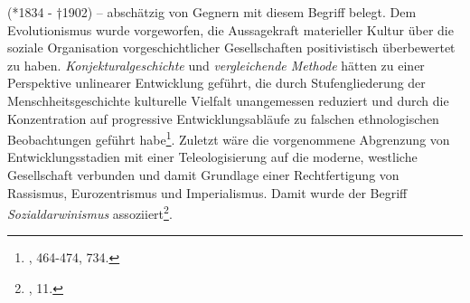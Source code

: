 \documentclass[openany,twoside,twocolumn]{book}
\let\rmarkdownfootnote\footnote%
\def\footnote{\protect\rmarkdownfootnote}
\begin{document}
(*1834 - †1902) -- abschätzig von Gegnern mit diesem Begriff belegt. Dem
Evolutionismus wurde vorgeworfen, die Aussagekraft materieller Kultur
über die soziale Organisation vorgeschichtlicher Gesellschaften
positivistisch überbewertet zu haben. \emph{Konjekturalgeschichte} und
\emph{vergleichende Methode} hätten zu einer Perspektive unlinearer
Entwicklung geführt, die durch Stufengliederung der
Menschheitsgeschichte kulturelle Vielfalt unangemessen reduziert und
durch die Konzentration auf progressive Entwicklungsabläufe zu falschen
ethnologischen Beobachtungen geführt habe\footnote{\textcite{petermann_geschichte_2004},
  464-474, 734.}. Zuletzt wäre die vorgenommene Abgrenzung von
Entwicklungsstadien mit einer Teleologisierung auf die moderne,
westliche Gesellschaft verbunden und damit Grundlage einer
Rechtfertigung von Rassismus, Eurozentrismus und Imperialismus. Damit
wurde der Begriff \emph{Sozialdarwinismus} assoziiert\footnote{\textcite{ShennanGenesmemeshuman2002},
  11.}.
\end{document}

